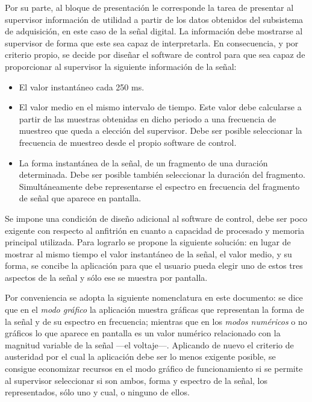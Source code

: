 Por su parte, al bloque de presentación le corresponde la tarea de
presentar al supervisor información de utilidad a partir de los datos
obtenidos del subsistema de adquisición, en este caso de la señal digital.
La información debe mostrarse al supervisor de forma que este sea capaz de
interpretarla. En consecuencia, y por criterio propio, se decide por
diseñar el software de control para que sea capaz de proporcionar al
supervisor la siguiente información de la señal: %

\begin{itemize}
	\item El valor instantáneo cada 250 ms.
	\item El valor medio en el mismo intervalo de tiempo. Este valor
		debe calcularse a partir de las muestras obtenidas en dicho
		periodo a una frecuencia de muestreo que queda a elección
		del supervisor. Debe ser posible seleccionar la frecuencia
		de muestreo desde el propio software de control.
	\item La forma instantánea de la señal, de un fragmento de una
		duración determinada. Debe ser posible también seleccionar
		la duración del fragmento. Simultáneamente debe
		representarse el espectro en frecuencia del fragmento de
		señal que aparece en pantalla.
\end{itemize}

Se impone una condición de diseño adicional al software de control, debe
ser poco exigente con respecto al \pc{} anfitrión en cuanto a capacidad de
procesado y memoria principal utilizada. Para lograrlo se propone la
siguiente solución: en lugar de mostrar al mismo tiempo el valor
instantáneo de la señal, el valor medio, y su forma, se concibe la
aplicación para que el usuario pueda elegir uno de estos tres aspectos de
la señal y sólo ese se muestra por pantalla.

Por conveniencia se adopta la siguiente nomenclatura en este documento: se
dice que en el \emph{modo gráfico} la aplicación muestra gráficas que
representan la forma de la señal y de su espectro en frecuencia; mientras
que en los \emph{modos numéricos} o no gráficos lo que aparece en pantalla
es un valor numérico relacionado con la magnitud variable de la señal ---el
voltaje---. Aplicando de nuevo el criterio de austeridad por el cual la
aplicación debe ser lo menos exigente posible, se consigue economizar
recursos en el modo gráfico de funcionamiento si se permite al supervisor
seleccionar si son ambos, forma y espectro de la señal, los representados,
sólo uno y cual, o ninguno de ellos.



